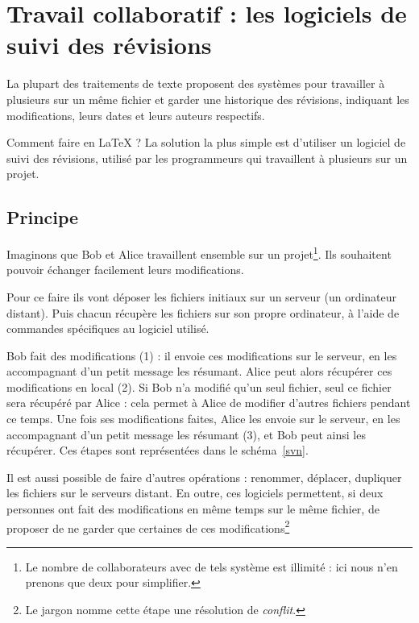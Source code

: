 \chapter{Travail collaboratif : les logiciels de suivi des révisions}\label{principesvn}    %

\begin{intro}
    La plupart des traitements de texte proposent des systèmes pour travailler à plusieurs sur un même fichier et garder une historique des révisions, indiquant les modifications, leurs dates et leurs auteurs respectifs. 
    
    Comment faire en \LaTeX{} ? La solution la plus simple est d'utiliser un logiciel de suivi des révisions, utilisé par les programmeurs qui travaillent à plusieurs sur un projet.
\end{intro}

\section{Principe}
Imaginons que Bob et Alice travaillent ensemble sur un projet\footnote{Le nombre de collaborateurs avec de tels système est illimité : ici nous n'en prenons que deux pour simplifier.}. Ils souhaitent pouvoir échanger facilement leurs modifications.

Pour ce faire ils vont déposer les fichiers initiaux sur un serveur (un ordinateur distant). Puis chacun récupère les fichiers sur son propre ordinateur, à l'aide de commandes spécifiques au logiciel utilisé.

Bob fait des modifications (1) : il envoie ces modifications sur le serveur, en les accompagnant d'un petit message les résumant. Alice peut alors récupérer ces modifications en local (2). Si Bob n'a modifié qu'un seul fichier, seul ce fichier sera récupéré par Alice : cela permet à Alice de modifier d'autres fichiers pendant ce temps. Une fois ses modifications faites, Alice les envoie sur le serveur, en les accompagnant d'un petit message les résumant (3), et Bob peut ainsi les récupérer. Ces étapes sont représentées dans le schéma~\ref{svn}. 

Il est aussi possible de faire d'autres opérations : renommer, déplacer, dupliquer les fichiers sur le serveurs distant. En outre, ces logiciels permettent, si deux personnes ont fait des modifications en même temps sur le même fichier, de proposer de ne garder que certaines de ces modifications\footnote{Le jargon nomme cette étape une résolution de \emph{conflit}.}

